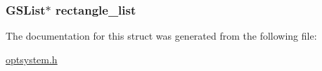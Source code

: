 \hypertarget{a00004_a74c86a6f406deb440600ab0679898043_a74c86a6f406deb440600ab0679898043}{
\subsubsection[{rectangle\-\_\-list}]{\setlength{\rightskip}{0pt plus 5cm}\-G\-S\-List$\ast$ {\bf rectangle\-\_\-list}}}\label{d0/d0b/a00004_a74c86a6f406deb440600ab0679898043_a74c86a6f406deb440600ab0679898043}


\-The documentation for this struct was generated from the following file\-:\begin{DoxyCompactItemize}
\item 
\hyperlink{a00018}{optsystem.\-h}\end{DoxyCompactItemize}
